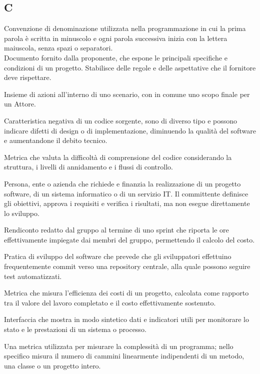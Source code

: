 \begin{center}
\section*{C}
\end{center}

Convenzione di denominazione utilizzata nella programmazione in cui la prima parola è scritta in minuscolo e ogni parola successiva inizia con la lettera maiuscola, senza spazi o separatori.\\

Documento fornito dalla proponente, che espone le principali specifiche e condizioni di un progetto. Stabilisce delle regole e delle aspettative che il fornitore deve rispettare.

Insieme di azioni all'interno di uno scenario, con in comune uno scopo finale per un Attore.

Caratteristica negativa di un codice sorgente, sono di diverso tipo e possono indicare difetti di design o di implementazione, diminuendo la qualità del software e aumentandone il debito tecnico.

Metrica che valuta la difficoltà di comprensione del codice considerando la struttura, i livelli di annidamento e i flussi di controllo.

Persona, ente o azienda che richiede e finanzia la realizzazione di un progetto software, di un sistema informatico o di un servizio IT. Il committente definisce gli obiettivi, approva i requisiti e verifica i risultati, ma non esegue direttamente lo sviluppo.

Rendiconto redatto dal gruppo al termine di uno sprint che riporta le ore effettivamente impiegate dai membri del gruppo, permettendo il calcolo del costo.

Pratica di sviluppo del software che prevede che gli sviluppatori effettuino frequentemente commit verso una repository centrale, alla quale possono seguire test automatizzati.

Metrica che misura l'efficienza dei costi di un progetto, calcolata come rapporto tra il valore del lavoro completato e il costo effettivamente sostenuto.

Interfaccia che mostra in modo sintetico dati e indicatori utili per monitorare lo stato e le prestazioni di un sistema o processo.

Una metrica utilizzata per misurare la complessità di un programma; nello specifico misura il numero di cammini linearmente indipendenti di un metodo, una classe o un progetto intero.

